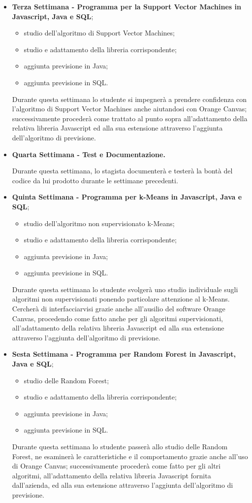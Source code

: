 \begin{itemize}
\item \textbf{Terza Settimana - Programma per la Support Vector Machines in Javascript, Java e SQL};
	\begin{itemize}
	\item studio dell'algoritmo di Support Vector Machines;
	\item studio e adattamento della libreria corrispondente;
	\item aggiunta previsione in Java; 
	\item aggiunta previsione in SQL.
	\end{itemize}
	Durante questa settimana lo studente si impegnerà a prendere confidenza con l'algoritmo di Support Vector Machines anche aiutandosi con Orange Canvas; successivamente procederà come trattato al punto sopra all'adattamento della relativa libreria Javascript ed alla sua estensione attraverso l'aggiunta dell'algoritmo di previsione.


\item \textbf{Quarta Settimana - Test e Documentazione.}
	\par Durante questa settimana, lo stagista documenterà e testerà la bontà del codice da lui prodotto durante le settimane precedenti.

\item \textbf{Quinta Settimana - Programma per k-Means in Javascript, Java e SQL};
\begin{itemize}
	\item studio dell'algoritmo non supervisionato k-Means;
	\item studio e adattamento della libreria corrispondente;
	\item aggiunta previsione in Java;
	\item aggiunta previsione in SQL.
	\end{itemize}
	Durante questa settimana lo studente svolgerà uno studio individuale sugli algoritmi non supervisionati ponendo particolare attenzione al k-Means. Cercherà di interfacciarvisi grazie anche all'ausilio del software Orange Canvas, procedendo come fatto anche per gli algoritmi supervisionati, all'adattamento della relativa libreria Javascript ed alla sua estensione attraverso l'aggiunta dell'algoritmo di previsione.
	
	
\item \textbf{Sesta Settimana - Programma per Random Forest in Javascript, Java e SQL};
\begin{itemize}
	\item studio delle Random Forest;
	\item studio e adattamento della libreria corrispondente;
	\item aggiunta previsione in Java;
	\item aggiunta previsione in SQL.
	\end{itemize}
	Durante questa settimana lo studente passerà allo studio delle Random Forest, ne esaminerà le caratteristiche e il comportamento grazie anche all'uso di Orange Canvas; successivamente procederà come fatto per gli altri algoritmi, all'adattamento della relativa libreria Javascript fornita dall'azienda, ed alla sua estensione attraverso l'aggiunta dell'algoritmo di previsione.
	

\end{itemize}
